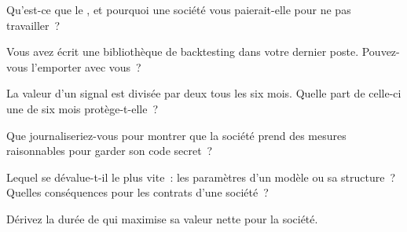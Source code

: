 \begin{interviewq}\label{iq:fm:intellectual-property-and-non-competes:1}
Qu'est-ce que le , et pourquoi une société vous paierait-elle pour ne pas travailler~?
\end{interviewq}

\begin{interviewq}\label{iq:fm:intellectual-property-and-non-competes:2}
Vous avez écrit une bibliothèque de backtesting dans votre dernier poste. Pouvez-vous l'emporter avec vous~?
\end{interviewq}

\begin{interviewq}\label{iq:fm:intellectual-property-and-non-competes:3}
La valeur d'un signal est divisée par deux tous les six mois. Quelle part de celle-ci une  de six mois protège-t-elle~?
\end{interviewq}

\begin{interviewq}\label{iq:fm:intellectual-property-and-non-competes:4}
Que journaliseriez-vous pour montrer que la société prend des mesures raisonnables pour garder son code secret~?
\end{interviewq}

\begin{interviewq}\label{iq:fm:intellectual-property-and-non-competes:5}
Lequel se dévalue-t-il le plus vite~: les paramètres d'un modèle ou sa structure~? Quelles conséquences pour les contrats d'une société~?
\end{interviewq}

\begin{interviewq}\label{iq:fm:intellectual-property-and-non-competes:6}
Dérivez la durée de  qui maximise sa valeur nette pour la société.
\end{interviewq}
